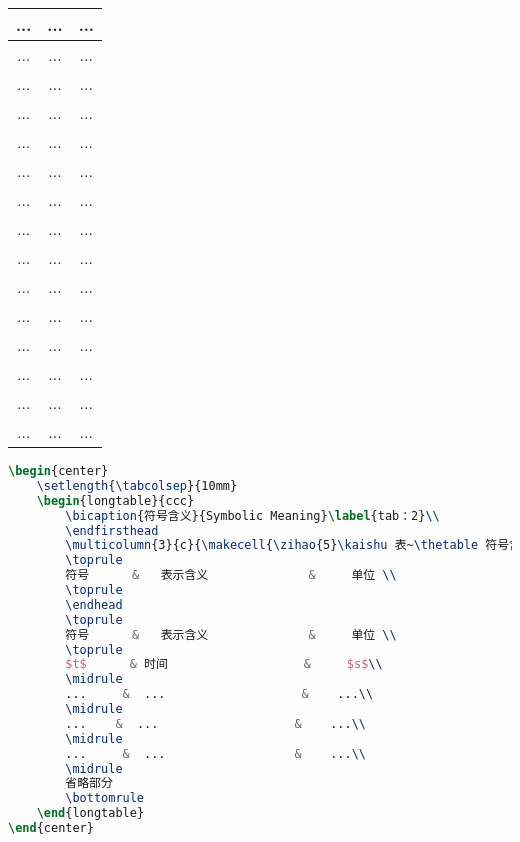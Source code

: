 \begin{center}
\begin{longtable}{ccc}
	\midrule 
	...    &  ...                   &    ...\\
	\midrule 
	...     &  ...                  &    ...\\
	\midrule
	...     &  ...                   &    ...\\
	\midrule 
	...    &  ...                   &    ...\\
	\midrule 
	...     &  ...                  &    ...\\ 
	\midrule
	...     &  ...                   &    ...\\
	\midrule 
	...    &  ...                   &    ...\\
	\midrule
	...     &  ...                   &    ...\\
	\midrule 
	...    &  ...                   &    ...\\
	\midrule 
	...     &  ...                  &    ...\\
	\midrule
	...     &  ...                   &    ...\\
	\midrule 
	...    &  ...                   &    ...\\
	\midrule 
	...     &  ...                  &    ...\\ 
	\midrule
	...     &  ...                   &    ...\\
	\midrule 
	...    &  ...                   &    ...\\
	\bottomrule
\end{longtable}
\end{center}

\begin{lstlisting}[language=TeX]
\begin{center}
	\setlength{\tabcolsep}{10mm}
	\begin{longtable}{ccc}
		\bicaption{符号含义}{Symbolic Meaning}\label{tab：2}\\
		\endfirsthead
		\multicolumn{3}{c}{\makecell{\zihao{5}\kaishu 表~\thetable 符号含义(续)\vspace{-8pt}\\\zihao{5}\kaishu Table\;\thetable \;Symbolic Meaning(continue)}}\\
		\toprule
		符号      &   表示含义              &     单位 \\
		\toprule
		\endhead
		\toprule
		符号      &   表示含义              &     单位 \\
		\toprule
		$t$      & 时间                   &     $s$\\
		\midrule
		...     &  ...                   &    ...\\
		\midrule 
		...    &  ...                   &    ...\\
		\midrule 
		...     &  ...                  &    ...\\
		\midrule
		省略部分
		\bottomrule
	\end{longtable}
\end{center}
\end{lstlisting}


